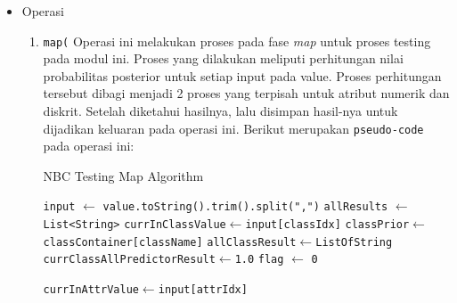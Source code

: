 \begin{enumerate}
\begin{itemize}
\begin{enumerate}
		\end{enumerate}
		
		\item{Operasi}
		\begin{enumerate}
			\item{\texttt{map(}}
			Operasi ini melakukan proses pada fase \textit{map} untuk proses testing pada modul ini. Proses yang dilakukan meliputi perhitungan nilai probabilitas posterior untuk setiap input pada value. Proses perhitungan tersebut dibagi menjadi 2 proses yang terpisah untuk atribut numerik dan diskrit. Setelah diketahui hasilnya, lalu disimpan hasil-nya untuk dijadikan keluaran pada operasi ini. Berikut merupakan \texttt{pseudo-code} pada operasi ini:
			\begin{algorithm}[H]
			\caption{NBC Testing Map Algorithm}\label{alg:NBCTestMap}
			\begin{algorithmic}[1]
			\State \texttt{input} $\gets$ \texttt{value.toString().trim().split(",")}
			\State \texttt{allResults} $\gets$ \texttt{List<String>}
				\State \texttt{currInClassValue}$ \gets $\texttt{input[classIdx]}
				\State \texttt{classPrior}$ \gets $\texttt{classContainer[className]}
				\State \texttt{allClassResult}$ \gets $\texttt{ListOfString}
					\State \texttt{currClassAllPredictorResult}$ \gets $\texttt{1.0}
					\State \texttt{flag} $\gets$ \texttt{0}
					
						\State \texttt{currInAttrValue}$ \gets $\texttt{input[attrIdx]}	
						

\end{algorithmic}
\end{algorithm}
\end{enumerate}
\end{itemize}
\end{enumerate}
